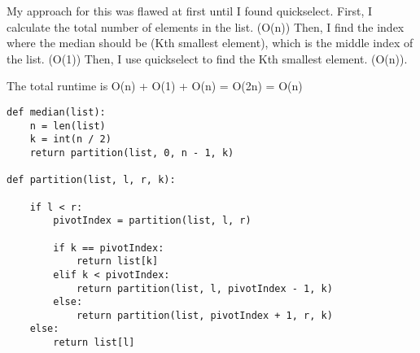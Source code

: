 \documentclass[11pt,largemargins]{homework}
\begin{document}
\newpage
\question

My approach for this was flawed at first until I found quickselect. First, I calculate the total number of elements in the list. (O(n)) Then, I find the index where the median should be (Kth smallest element), which is the middle index of the list. (O(1)) Then, I use quickselect to find the Kth smallest element. (O(n)).

The total runtime is O(n) + O(1) + O(n) = O(2n) = O(n)

\begin{verbatim}
def median(list):
    n = len(list)
    k = int(n / 2)
    return partition(list, 0, n - 1, k)

def partition(list, l, r, k):

    if l < r:
        pivotIndex = partition(list, l, r)

        if k == pivotIndex:
            return list[k]
        elif k < pivotIndex:
            return partition(list, l, pivotIndex - 1, k)
        else:
            return partition(list, pivotIndex + 1, r, k)
    else:
        return list[l]
\end{verbatim}
\end{document}
